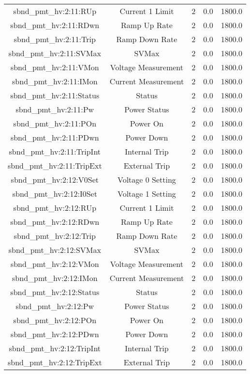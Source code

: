\begin{table}[ptb]
\begin{tabular}{c | c c c c}
sbnd_pmt_hv:2:11:RUp & Current 1 Limit & 2 & 0.0 & 1800.0\\ 
sbnd_pmt_hv:2:11:RDwn & Ramp Up Rate & 2 & 0.0 & 1800.0\\ 
sbnd_pmt_hv:2:11:Trip & Ramp Down Rate & 2 & 0.0 & 1800.0\\ 
sbnd_pmt_hv:2:11:SVMax & SVMax & 2 & 0.0 & 1800.0\\ 
sbnd_pmt_hv:2:11:VMon & Voltage Measurement & 2 & 0.0 & 1800.0\\ 
sbnd_pmt_hv:2:11:IMon & Current Measurement & 2 & 0.0 & 1800.0\\ 
sbnd_pmt_hv:2:11:Status & Status & 2 & 0.0 & 1800.0\\ 
sbnd_pmt_hv:2:11:Pw & Power Status & 2 & 0.0 & 1800.0\\ 
sbnd_pmt_hv:2:11:POn & Power On & 2 & 0.0 & 1800.0\\ 
sbnd_pmt_hv:2:11:PDwn & Power Down & 2 & 0.0 & 1800.0\\ 
sbnd_pmt_hv:2:11:TripInt & Internal Trip & 2 & 0.0 & 1800.0\\ 
sbnd_pmt_hv:2:11:TripExt & External Trip & 2 & 0.0 & 1800.0\\ 
sbnd_pmt_hv:2:12:V0Set & Voltage 0 Setting & 2 & 0.0 & 1800.0\\ 
sbnd_pmt_hv:2:12:I0Set & Voltage 1 Setting & 2 & 0.0 & 1800.0\\ 
sbnd_pmt_hv:2:12:RUp & Current 1 Limit & 2 & 0.0 & 1800.0\\ 
sbnd_pmt_hv:2:12:RDwn & Ramp Up Rate & 2 & 0.0 & 1800.0\\ 
sbnd_pmt_hv:2:12:Trip & Ramp Down Rate & 2 & 0.0 & 1800.0\\ 
sbnd_pmt_hv:2:12:SVMax & SVMax & 2 & 0.0 & 1800.0\\ 
sbnd_pmt_hv:2:12:VMon & Voltage Measurement & 2 & 0.0 & 1800.0\\ 
sbnd_pmt_hv:2:12:IMon & Current Measurement & 2 & 0.0 & 1800.0\\ 
sbnd_pmt_hv:2:12:Status & Status & 2 & 0.0 & 1800.0\\ 
sbnd_pmt_hv:2:12:Pw & Power Status & 2 & 0.0 & 1800.0\\ 
sbnd_pmt_hv:2:12:POn & Power On & 2 & 0.0 & 1800.0\\ 
sbnd_pmt_hv:2:12:PDwn & Power Down & 2 & 0.0 & 1800.0\\ 
sbnd_pmt_hv:2:12:TripInt & Internal Trip & 2 & 0.0 & 1800.0\\ 
sbnd_pmt_hv:2:12:TripExt & External Trip & 2 & 0.0 & 1800.0\\ 

\end{tabular}
\end{table}

